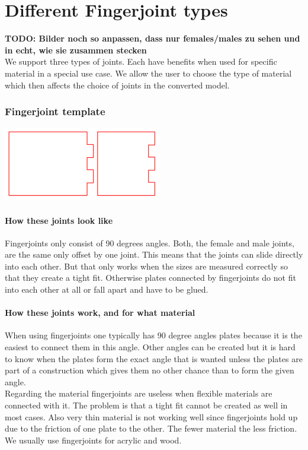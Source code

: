\documentclass[../ClassicThesis.tex]{subfiles}
\begin{document}
\section{Different Fingerjoint types}
\textbf{TODO: Bilder noch so anpassen, dass nur females/males zu sehen und in echt, wie sie zusammen stecken}\\
We support three types of joints. Each have benefits when used for specific material in a special use case. We allow the user to choose the type of material which then affects the choice of joints in the converted model.
\subsubsection{Fingerjoint template}
\includegraphics[width=0.5\columnwidth]{Images/fingerjoints.png}
\paragraph{How these joints look like}
Fingerjoints only consist of 90 degrees angles. Both, the female and male joints, are the same only offset by one joint. This means that the joints can slide directly into each other. But that only works when the sizes are measured correctly so that they create a tight fit. Otherwise plates connected by fingerjoints do not fit into each other at all or fall apart and have to be glued. 
\paragraph{How these joints work, and for what material}
When using fingerjoints one typically has 90 degree angles plates because it is the easiest to connect them in this angle. Other angles can be created but it is hard to know when the plates form the exact angle that is wanted unless the plates are part of a construction which gives them no other chance than to form the given angle.\\
Regarding the material fingerjoints are useless when flexible materials are connected with it. The problem is that a tight fit cannot be created as well in most cases. Also very thin material is not working well since fingerjoints hold up due to the friction of one plate to the other. The fewer material the less friction.\\
We usually use fingerjoints for acrylic and wood.
\end{document}
